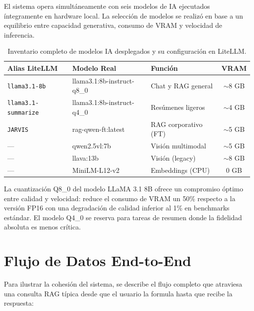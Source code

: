 El sistema opera simultáneamente con seis modelos de IA ejecutados íntegramente en hardware local. La selección de modelos se realizó en base a un equilibrio entre capacidad generativa, consumo de VRAM y velocidad de inferencia.

\begin{table}[H]
\centering
\caption{Inventario completo de modelos IA desplegados y su configuración en LiteLLM.}
\label{tab:modelos-litellm}
\begin{tabular}{lllc}
\toprule
\textbf{Alias LiteLLM} & \textbf{Modelo Real} & \textbf{Función} & \textbf{VRAM} \\
\midrule
\texttt{llama3.1-8b}      & llama3.1:8b-instruct-q8\_0     & Chat y RAG general  & $\sim$8 GB \\
\texttt{llama3.1-summarize}& llama3.1:8b-instruct-q4\_0     & Resúmenes ligeros   & $\sim$4 GB \\
\texttt{JARVIS}            & rag-qwen-ft:latest             & RAG corporativo (FT)& $\sim$5 GB \\
---                        & qwen2.5vl:7b                   & Visión multimodal   & $\sim$5 GB \\
---                        & llava:13b                      & Visión (legacy)     & $\sim$8 GB \\
---                        & MiniLM-L12-v2                  & Embeddings (CPU)    & 0 GB \\
\bottomrule
\end{tabular}
\end{table}

La cuantización Q8\_0 del modelo LLaMA 3.1 8B ofrece un compromiso óptimo entre calidad y velocidad: reduce el consumo de VRAM un 50\% respecto a la versión FP16 con una degradación de calidad inferior al 1\% en benchmarks estándar. El modelo Q4\_0 se reserva para tareas de resumen donde la fidelidad absoluta es menos crítica.

\section{Flujo de Datos End-to-End}

Para ilustrar la cohesión del sistema, se describe el flujo completo que atraviesa una consulta RAG típica desde que el usuario la formula hasta que recibe la respuesta:

